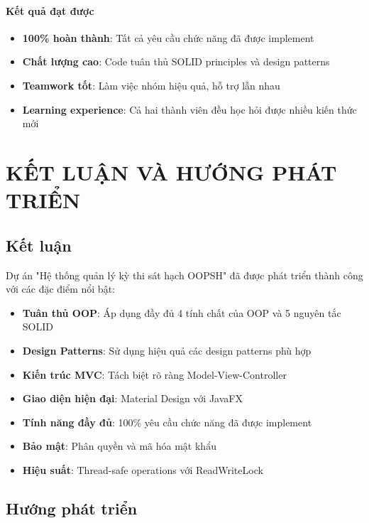 \documentclass[12pt,a4paper]{article}
\begin{document}
 \paragraph{Kết quả đạt được}
 \begin{itemize}
     \item \textbf{100\% hoàn thành}: Tất cả yêu cầu chức năng đã được implement
     \item \textbf{Chất lượng cao}: Code tuân thủ SOLID principles và design patterns
     \item \textbf{Teamwork tốt}: Làm việc nhóm hiệu quả, hỗ trợ lẫn nhau
     \item \textbf{Learning experience}: Cả hai thành viên đều học hỏi được nhiều kiến thức mới
 \end{itemize}

 \section{KẾT LUẬN VÀ HƯỚNG PHÁT TRIỂN}

\subsection{Kết luận}

Dự án "Hệ thống quản lý kỳ thi sát hạch OOPSH" đã được phát triển thành công với các đặc điểm nổi bật:

\begin{itemize}
    \item \textbf{Tuân thủ OOP}: Áp dụng đầy đủ 4 tính chất của OOP và 5 nguyên tắc SOLID
    \item \textbf{Design Patterns}: Sử dụng hiệu quả các design patterns phù hợp
    \item \textbf{Kiến trúc MVC}: Tách biệt rõ ràng Model-View-Controller
    \item \textbf{Giao diện hiện đại}: Material Design với JavaFX
    \item \textbf{Tính năng đầy đủ}: 100\% yêu cầu chức năng đã được implement
    \item \textbf{Bảo mật}: Phân quyền và mã hóa mật khẩu
    \item \textbf{Hiệu suất}: Thread-safe operations với ReadWriteLock
\end{itemize}

\subsection{Hướng phát triển}
\end{document}

